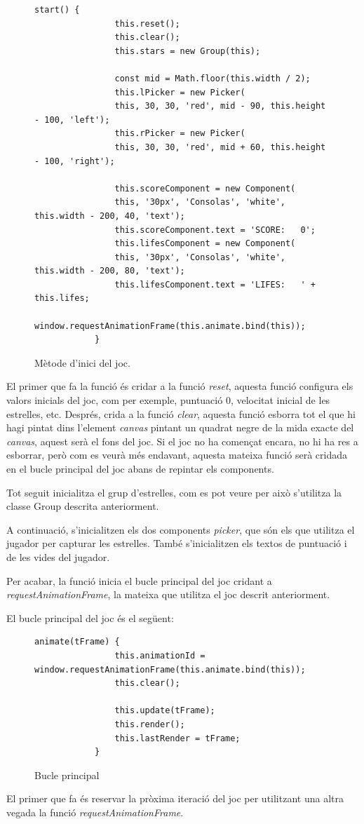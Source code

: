 \documentclass[12pt,a4paper,catalan]{article}
\begin{document}
	\begin{figure}[H]
		\begin{lstlisting}[gobble=12, tabsize=4]
			start() {
				this.reset();
				this.clear();
				this.stars = new Group(this);
				
				const mid = Math.floor(this.width / 2);
				this.lPicker = new Picker(
				this, 30, 30, 'red', mid - 90, this.height - 100, 'left');
				this.rPicker = new Picker(
				this, 30, 30, 'red', mid + 60, this.height - 100, 'right');
				
				this.scoreComponent = new Component(
				this, '30px', 'Consolas', 'white', this.width - 200, 40, 'text');
				this.scoreComponent.text = 'SCORE:   0';
				this.lifesComponent = new Component(
				this, '30px', 'Consolas', 'white', this.width - 200, 80, 'text');
				this.lifesComponent.text = 'LIFES:   ' + this.lifes;
				window.requestAnimationFrame(this.animate.bind(this));
			}
		\end{lstlisting}
		\caption{Mètode d'inici del joc.}
		\label{fig:start-method}
	\end{figure}
	El primer que fa la funció és cridar a la funció \textit{reset}, aquesta funció configura els valors inicials del joc, com per exemple, puntuació 0, velocitat inicial de les estrelles, etc.
	Després, crida a la funció \textit{clear}, aquesta funció esborra tot el que hi hagi pintat dins l'element \textit{canvas} pintant un quadrat negre de la mida exacte del \textit{canvas}, aquest serà el fons del joc. Si el joc no ha començat encara, no hi ha res a esborrar, però com es veurà més endavant, aquesta mateixa funció serà cridada en el bucle principal del joc abans de repintar els components.
	
	Tot seguit inicialitza el grup d'estrelles, com es pot veure per això s'utilitza la classe Group descrita anteriorment.
	
	A continuació, s'inicialitzen els dos components \textit{picker}, que són els que utilitza el jugador per capturar les estrelles. També s'inicialitzen els textos de puntuació i de les vides del jugador.
	
	Per acabar, la funció inicia el bucle principal del joc cridant a \textit{requestAnimationFrame}, la mateixa que utilitza el joc descrit anteriorment.
	
	El bucle principal del joc és el següent:
	\begin{figure}[H]
		\begin{lstlisting}[gobble=12, tabsize=4]
			animate(tFrame) {
				this.animationId = window.requestAnimationFrame(this.animate.bind(this));
				this.clear();
				
				this.update(tFrame);
				this.render();
				this.lastRender = tFrame;
			}
		\end{lstlisting}
		\caption{Bucle principal}
		\label{fig:catch-stars-loop}
	\end{figure}
	El primer que fa és reservar la pròxima iteració del joc per utilitzant una altra vegada la funció \textit{requestAnimationFrame}.
	
\end{document}
